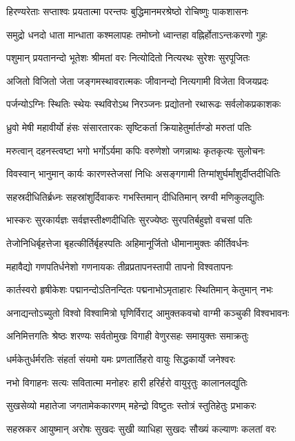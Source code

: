 \twolineshloka
{हिरण्यरेताः सप्ताश्वः प्रयतात्मा परन्तपः}
{बुद्धिमानमरश्रेष्ठो रोचिष्णुः पाकशासनः}%

\twolineshloka
{समुद्रो धनदो धाता मान्धाता कश्मलापहः}
{तमोघ्नो ध्वान्तहा वह्निर्होताऽन्तःकरणो गुहः}%

\twolineshloka
{पशुमान् प्रयतानन्दो भूतेशः श्रीमतां वरः}
{नित्योदितो नित्यरथः सुरेशः सुरपूजितः}%

\twolineshloka
{अजितो विजितो जेता जङ्गमस्थावरात्मकः}
{जीवानन्दो नित्यगामी विजेता विजयप्रदः}%

\twolineshloka
{पर्जन्योऽग्निः स्थितिः स्थेयः स्थविरोऽथ निरञ्जनः}
{प्रद्योतनो रथारूढः सर्वलोकप्रकाशकः}%

\twolineshloka
{ध्रुवो मेषी महावीर्यो हंसः संसारतारकः}
{सृष्टिकर्ता क्रियाहेतुर्मार्तण्डो मरुतां पतिः}%

\twolineshloka
{मरुत्वान् दहनस्त्वष्टा भगो भर्गोऽर्यमा कपिः}
{वरुणेशो जगन्नाथः कृतकृत्यः सुलोचनः}%

\twolineshloka
{विवस्वान् भानुमान् कार्यः कारणस्तेजसां निधिः}
{असङ्गगामी तिग्मांशुर्घर्मांशुर्दीप्तदीधितिः}%

\twolineshloka
{सहस्रदीधितिर्ब्रध्नः सहस्रांशुर्दिवाकरः}
{गभस्तिमान् दीधितिमान् स्रग्वी मणिकुलद्युतिः}%

\twolineshloka
{भास्करः सुरकार्यज्ञः सर्वज्ञस्तीक्ष्णदीधितिः}
{सुरज्येष्ठः सुरपतिर्बहुज्ञो वचसां पतिः}%

\twolineshloka
{तेजोनिधिर्बृहत्तेजा बृहत्कीर्तिर्बृहस्पतिः}
{अहिमानूर्जितो धीमानामुक्तः कीर्तिवर्धनः}%

\twolineshloka
{महावैद्यो गणपतिर्धनेशो गणनायकः}
{तीव्रप्रतापनस्तापी तापनो विश्वतापनः}%

\twolineshloka
{कार्तस्वरो हृषीकेशः पद्मानन्दोऽतिनन्दितः}
{पद्मनाभोऽमृताहारः स्थितिमान् केतुमान् नभः}%

\twolineshloka
{अनाद्यन्तोऽच्युतो विश्वो विश्वामित्रो घृणिर्विराट्}
{आमुक्तकवचो वाग्मी कञ्चुकी विश्वभावनः}%

\twolineshloka
{अनिमित्तगतिः श्रेष्ठः शरण्यः सर्वतोमुखः}
{विगाही वेणुरसहः समायुक्तः समाक्रतुः}%

\twolineshloka
{धर्मकेतुर्धर्मरतिः संहर्ता संयमो यमः}
{प्रणतार्तिहरो वायुः सिद्धकार्यो जनेश्वरः}%

\twolineshloka
{नभो विगाहनः सत्यः सवितात्मा मनोहरः}
{हारी हरिर्हरो वायुरृतुः कालानलद्युतिः}%

\twolineshloka
{सुखसेव्यो महातेजा जगतामेककारणम्}
{महेन्द्रो विष्टुतः स्तोत्रं स्तुतिहेतुः प्रभाकरः}%

\twolineshloka
{सहस्रकर आयुष्मान् अरोषः सुखदः सुखी}
{व्याधिहा सुखदः सौख्यं कल्याणः कलतां वरः}%

